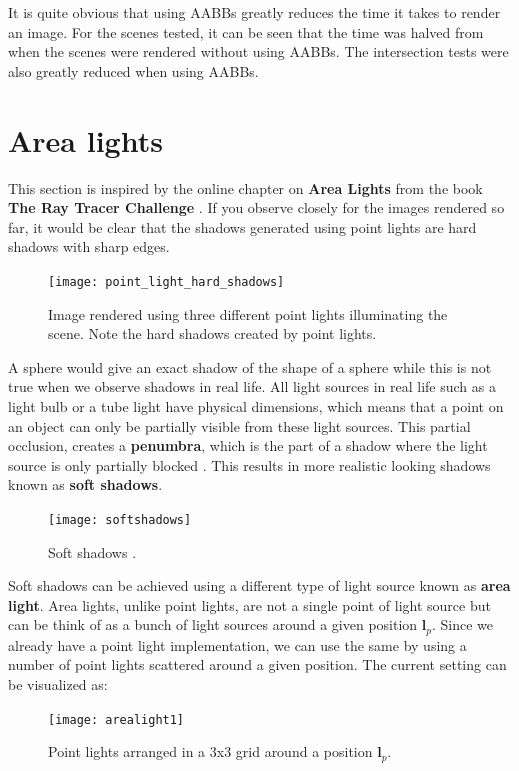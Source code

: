 \documentclass[11pt,a4paper]{article}
\begin{document}
	\noindent
	It is quite obvious that using AABBs greatly reduces the time it takes to render an image. For the scenes tested, it can be seen that the time was halved from when the scenes were rendered without using AABBs. The intersection tests were also greatly reduced when using AABBs.
	
	\section{Area lights}
	This section is inspired by the online chapter on \textbf{Area Lights} from the book \textbf{The Ray Tracer Challenge} \cite{TRTChallenge}.
	If you observe closely for the images rendered so far, it would be clear that the shadows generated using point lights are hard shadows with sharp edges. 
	\begin{figure}[H]
		\centering
		\captionsetup{justification=centering}
		\texttt{[image: point\_light\_hard\_shadows]}\quad
		\caption{Image rendered using three different point lights illuminating the scene. Note the hard shadows created by point lights.}
	\end{figure}
	\noindent
	A sphere would give an exact shadow of the shape of a sphere while this is not true when we observe shadows in real life. All light sources in real life such as a light bulb or a tube light have physical dimensions, which means that a point on an object can only be partially visible from these light sources. This partial occlusion, creates a \textbf{penumbra}, which is the part of a shadow where the light source is only partially blocked \cite{penumbra}. This results in more realistic looking shadows known as \textbf{soft shadows}.
	\begin{figure}[H]
		\centering
		\captionsetup{justification=centering}
		\texttt{[image: softshadows]}\quad
		\caption{Soft shadows \protect\cite{christensen2018renderman}.}
	\end{figure}
	\noindent
	Soft shadows can be achieved using a different type of light source known as \textbf{area light}. Area lights, unlike point lights, are not a single point of light source but can be think of as a bunch of light sources around a given position $\boldsymbol{l}_{p}$. Since we already have a point light implementation, we can use the same by using a number of point lights scattered around a given position. The current setting can be visualized as:
	\begin{figure}[H]
		\centering
		\captionsetup{justification=centering}
		\texttt{[image: arealight1]}\quad
		\caption{Point lights arranged in a 3x3 grid around a position $\boldsymbol{l}_{p}$.}
	\end{figure}
\end{document}
